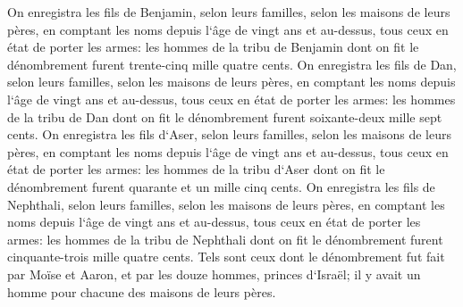 \verse On enregistra les fils de Benjamin, selon leurs familles, selon les maisons de leurs pères, en comptant les noms depuis l`âge de vingt ans et au-dessus, tous ceux en état de porter les armes: 
\verse les hommes de la tribu de Benjamin dont on fit le dénombrement furent trente-cinq mille quatre cents. 
\verse On enregistra les fils de Dan, selon leurs familles, selon les maisons de leurs pères, en comptant les noms depuis l`âge de vingt ans et au-dessus, tous ceux en état de porter les armes: 
\verse les hommes de la tribu de Dan dont on fit le dénombrement furent soixante-deux mille sept cents. 
\verse On enregistra les fils d`Aser, selon leurs familles, selon les maisons de leurs pères, en comptant les noms depuis l`âge de vingt ans et au-dessus, tous ceux en état de porter les armes: 
\verse les hommes de la tribu d`Aser dont on fit le dénombrement furent quarante et un mille cinq cents. 
\verse On enregistra les fils de Nephthali, selon leurs familles, selon les maisons de leurs pères, en comptant les noms depuis l`âge de vingt ans et au-dessus, tous ceux en état de porter les armes: 
\verse les hommes de la tribu de Nephthali dont on fit le dénombrement furent cinquante-trois mille quatre cents. 
\verse Tels sont ceux dont le dénombrement fut fait par Moïse et Aaron, et par les douze hommes, princes d`Israël; il y avait un homme pour chacune des maisons de leurs pères. 
